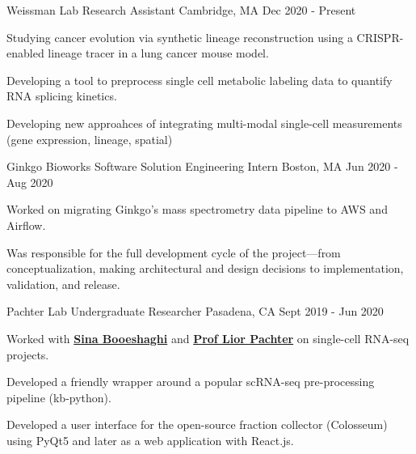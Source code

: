 

\begin{cventries}

\cventry
  {Weissman Lab} %
  {Research Assistant} %
  {Cambridge, MA} %
  {Dec 2020 - Present} %
  {
    \begin{cvitems} %
      \item {Studying cancer evolution via synthetic lineage reconstruction using a CRISPR-enabled lineage tracer in a lung cancer mouse model.}
      \item {Developing a tool to preprocess single cell metabolic labeling data to quantify RNA splicing kinetics.}
      \item {Developing new approahces of integrating multi-modal single-cell measurements (gene expression, lineage, spatial)}
    \end{cvitems}
  }

  \cventry
    {Ginkgo Bioworks} %
    {Software Solution Engineering Intern} %
    {Boston, MA} %
    {Jun 2020 - Aug 2020} %
    {
      \begin{cvitems} %
        \item {Worked on migrating Ginkgo's mass spectrometry data pipeline to AWS and Airflow.}
        \item {Was responsible for the full development cycle of the project---from conceptualization, making architectural and design decisions to implementation, validation, and release.}
      \end{cvitems}
    }

\cventry
  {Pachter Lab} %
  {Undergraduate Researcher} %
  {Pasadena, CA} %
  {Sept 2019 - Jun 2020} %
  {
    \begin{cvitems} %
      \item {Worked with \textbf{\href{https://sinabooeshaghi.com/}{Sina Booeshaghi}} and \textbf{\href{https://pachterlab.github.io/biography.html}{Prof Lior Pachter}} on single-cell RNA-seq projects.}
      \item {Developed a friendly wrapper around a popular scRNA-seq pre-processing pipeline (kb-python).}
      \item {Developed a user interface for the open-source fraction collector (Colosseum) using PyQt5 and later as a web application with React.js.}
    \end{cvitems}
  }


\end{cventries}
